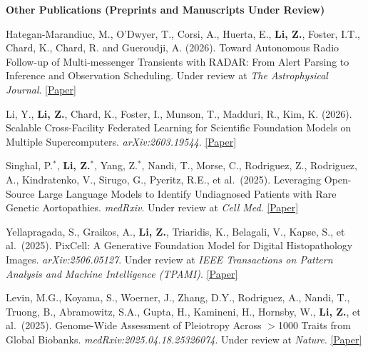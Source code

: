 \documentclass[letterpaper,11pt]{article}
\newcommand{\PubSection}[1]{%
  \vspace{6pt}\noindent\textbf{#1}\vspace{3pt}%
}
\begin{document}
\PubSection{Other Publications (Preprints and Manuscripts Under Review)}
\begin{enumerate}[leftmargin=1cm, label={[\arabic*]}, itemsep=3pt]
  \small
    \item Hategan-Marandiuc, M., O'Dwyer, T., Corsi, A., Huerta, E., \textbf{Li, Z.}, Foster, I.T., Chard, K., Chard, R. and Gueroudji, A. (2026). Toward Autonomous Radio Follow-up of Multi-messenger Transients with RADAR: From Alert Parsing to Inference and Observation Scheduling. Under review at \textit{The Astrophysical Journal}. \href{https://arxiv.org/abs/2609.18233}{[Paper]}
  
  \item Li, Y., \textbf{Li, Z.}, Chard, K., Foster, I., Munson, T., Madduri, R., Kim, K. (2026). Scalable Cross-Facility Federated Learning for Scientific Foundation Models on Multiple Supercomputers. \textit{arXiv:2603.19544}. \href{https://arxiv.org/abs/2603.19544}{[Paper]}

  \item Singhal, P.$^*$, \textbf{Li, Z.$^*$}, Yang, Z.$^*$, Nandi, T., Morse, C., Rodriguez, Z., Rodriguez, A., Kindratenko, V., Sirugo, G., Pyeritz, R.E., et al.\ (2025). Leveraging Open-Source Large Language Models to Identify Undiagnosed Patients with Rare Genetic Aortopathies. \textit{medRxiv}. Under review at \textit{Cell Med}. \href{https://www.medrxiv.org/content/10.1101/2025.09.05.25333227v2}{[Paper]}
  
  \item Yellapragada, S., Graikos, A., \textbf{Li, Z.}, Triaridis, K., Belagali, V., Kapse, S., et al.\ (2025). PixCell: A Generative Foundation Model for Digital Histopathology Images. \textit{arXiv:2506.05127}. Under review at \textit{IEEE Transactions on Pattern Analysis and Machine Intelligence (TPAMI)}. \href{https://arxiv.org/abs/2506.05127}{[Paper]}


  \item Levin, M.G., Koyama, S., Woerner, J., Zhang, D.Y., Rodriguez, A., Nandi, T., Truong, B., Abramowitz, S.A., Gupta, H., Kamineni, H., Hornsby, W., \textbf{Li, Z.}, et al.\ (2025). Genome-Wide Assessment of Pleiotropy Across $>$1000 Traits from Global Biobanks. \textit{medRxiv:2025.04.18.25326074}. Under review at \textit{Nature}. \href{https://www.medrxiv.org/content/10.1101/2025.04.18.25326074v2}{[Paper]}

  
\end{enumerate}
\end{document}
